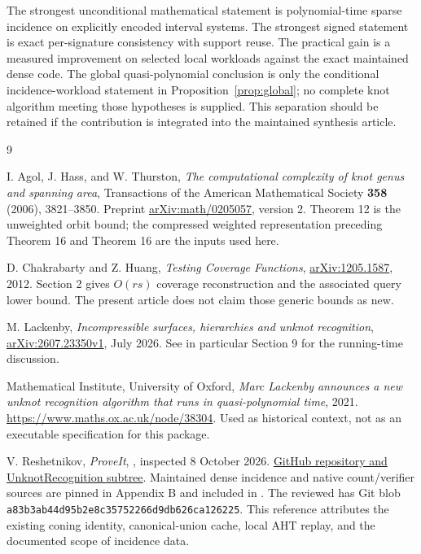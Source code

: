 \documentclass[11pt,letterpaper]{article}
\theoremstyle{definition}\newtheorem{definition}[theorem]{Definition}
\theoremstyle{remark}\newtheorem{remark}[theorem]{Remark}
\begin{document}
The strongest unconditional mathematical statement is polynomial-time sparse incidence on explicitly encoded interval systems. The strongest signed statement is exact per-signature consistency with support reuse. The practical gain is a measured improvement on selected local workloads against the exact maintained dense code. The global quasi-polynomial conclusion is only the conditional incidence-workload statement in Proposition~\ref{prop:global}; no complete knot algorithm meeting those hypotheses is supplied. This separation should be retained if the contribution is integrated into the maintained synthesis article.

\begin{thebibliography}{9}

I. Agol, J. Hass, and W. Thurston,
\emph{The computational complexity of knot genus and spanning area},
Transactions of the American Mathematical Society \textbf{358} (2006), 3821--3850.
Preprint \href{https://arxiv.org/abs/math/0205057}{arXiv:math/0205057}, version 2.
Theorem 12 is the unweighted orbit bound; the compressed weighted representation preceding Theorem 16 and Theorem 16 are the inputs used here.

D. Chakrabarty and Z. Huang,
\emph{Testing Coverage Functions},
\href{https://arxiv.org/abs/1205.1587}{arXiv:1205.1587}, 2012.
Section 2 gives $O(rs)$ coverage reconstruction and the associated query lower bound. The present article does not claim those generic bounds as new.

M. Lackenby,
\emph{Incompressible surfaces, hierarchies and unknot recognition},
\href{https://arxiv.org/abs/2607.23350}{arXiv:2607.23350v1}, July 2026.
See in particular Section 9 for the running-time discussion.

Mathematical Institute, University of Oxford,
\emph{Marc Lackenby announces a new unknot recognition algorithm that runs in quasi-polynomial time}, 2021.
\url{https://www.maths.ox.ac.uk/node/38304}.
Used as historical context, not as an executable specification for this package.

V. Reshetnikov, \emph{ProveIt}, , inspected 8 October 2026.
\href{https://github.com/VladimirReshetnikov/ProveIt/tree/main/Topology/UnknotRecognition}{GitHub repository and UnknotRecognition subtree}.
Maintained dense incidence and native count/verifier sources are pinned in Appendix B and included in . The reviewed  has Git blob
\texttt{a83b3ab44d95b2e8c35752266d9db626ca126225}.
This reference attributes the existing coning identity, canonical-union cache, local AHT replay, and the documented scope of incidence data.

\end{thebibliography}
\end{document}
